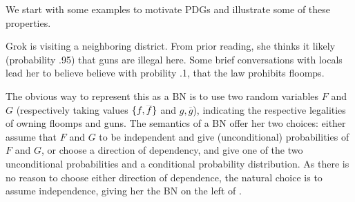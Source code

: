 \documentclass[letterpaper]{article} %
\theoremstyle{plain}
\theoremstyle{definition}
\theoremstyle{remark}
\begin{document}
We start with some examples to motivate PDGs and illustrate some of these properties.  

\begin{example} \label{ex:guns-and-floomps}
Grok is visiting a neighboring district. From prior reading, she thinks it likely (probability
.95) that guns are illegal here. Some brief conversations with locals lead her to believe believe with
probility .1, that the law prohibits floomps.

The obvious way to represent this as a BN is to use two random variables
$F$ and $G$ (respectively taking values $\{f, \smash{\overline f}\}$ and $g, \overline g$), indicating the respective legalities of owning floomps and guns.
The semantics of a 
BN
offer her two choices: either assume that $F$ and $G$
to be independent and give (unconditional) probabilities of $F$ and $G$, or
choose a direction of dependency, and give one of the two unconditional
probabilities and a conditional probability distribution. 
As there is no reason to choose either direction of dependence, the
natural choice is to 
assume independence, giving her the 
BN on the left of .

\begin{figure}[htb]
  \centering
\end{figure}
\end{example}
\end{document}
